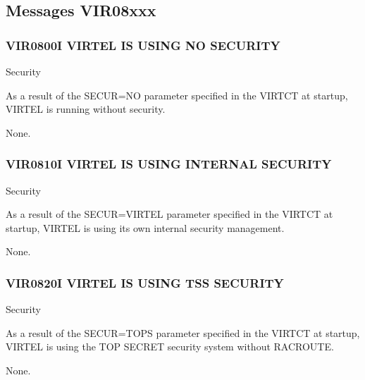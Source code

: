 \documentclass[letterpaper,10pt,english]{sphinxmanual}
\begin{document}
\subsection{Messages VIR08xxx}
\label{\detokenize{messages:messages-vir08xxx}}

\subsubsection{VIR0800I VIRTEL IS USING NO SECURITY}
\label{\detokenize{messages:vir0800i-virtel-is-using-no-security}}\begin{description}
\sphinxAtStartPar
Security

\sphinxAtStartPar
As a result of the SECUR=NO parameter specified in the VIRTCT at startup, VIRTEL is running without security.

\sphinxAtStartPar
None.

\end{description}


\subsubsection{VIR0810I VIRTEL IS USING INTERNAL SECURITY}
\label{\detokenize{messages:vir0810i-virtel-is-using-internal-security}}\begin{description}
\sphinxAtStartPar
Security

\sphinxAtStartPar
As a result of the SECUR=VIRTEL parameter specified in the VIRTCT at startup, VIRTEL is using its own internal security management.

\sphinxAtStartPar
None.

\end{description}


\subsubsection{VIR0820I VIRTEL IS USING TSS SECURITY}
\label{\detokenize{messages:vir0820i-virtel-is-using-tss-security}}\begin{description}
\sphinxAtStartPar
Security

\sphinxAtStartPar
As a result of the SECUR=TOPS parameter specified in the VIRTCT at startup, VIRTEL is using the TOP SECRET security system without RACROUTE.

\sphinxAtStartPar
None.

\end{description}
\end{document}
